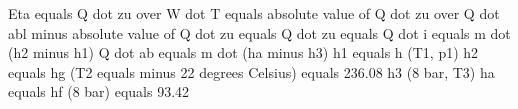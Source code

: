 Eta equals Q dot zu over W dot T equals absolute value of Q dot zu over Q dot abl minus absolute value of Q dot zu equals  
Q dot zu equals Q dot i equals m dot (h2 minus h1)  
Q dot ab equals m dot (ha minus h3)  
h1 equals h (T1, p1)  
h2 equals hg (T2 equals minus 22 degrees Celsius) equals 236.08  
h3 (8 bar, T3)  
ha equals hf (8 bar) equals 93.42